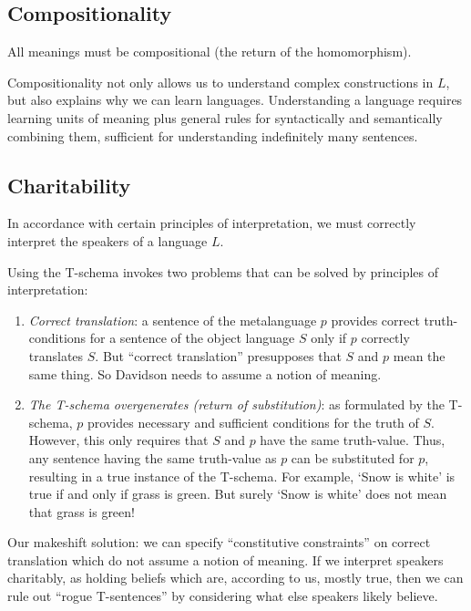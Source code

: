 \subsection{Compositionality}

\begin{definition}
All meanings must be compositional (the return of the homomorphism).
\end{definition}

Compositionality not only allows us to understand complex constructions in $L$, but also explains why we can learn languages. Understanding a language requires learning units of meaning plus general rules for syntactically and semantically combining them, sufficient for understanding indefinitely many sentences.

\subsection{Charitability}

\begin{definition}
In accordance with certain principles of interpretation, we must correctly interpret the speakers of a language $L$.
\end{definition}

Using the T-schema invokes two problems that can be solved by principles of interpretation:
\begin{enumerate}
  \item \emph{Correct translation}: a sentence of the metalanguage $p$ provides correct truth-conditions for a sentence of the object language $S$ only if $p$ correctly translates $S$. But ``correct translation'' presupposes that $S$ and $p$ mean the same thing. So Davidson needs to assume a notion of meaning.
  \item \emph{The T-schema overgenerates (return of substitution)}: as formulated by the T-schema, $p$ provides necessary and sufficient conditions for the truth of $S$. However, this only requires that $S$ and $p$ have the same truth-value. Thus, any sentence having the same truth-value as $p$ can be substituted for $p$, resulting in a true instance of the T-schema. For example, `Snow is white' is true if and only if grass is green. But surely `Snow is white' does not mean that grass is green!
\end{enumerate}

Our makeshift solution: we can specify ``constitutive constraints'' on correct translation which do not assume a notion of meaning. If we interpret speakers charitably, as holding beliefs which are, according to us, mostly true, then we can rule out ``rogue T-sentences'' by considering what else speakers likely believe.


